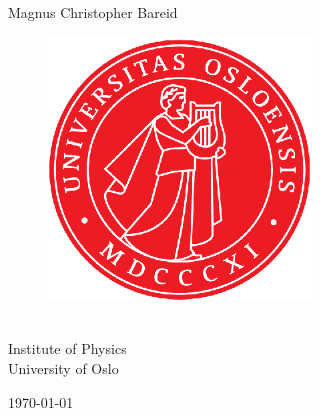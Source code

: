 \begin{titlepage}
    \begin{center}
    
    \bfseries
    \huge%
    \mintittel
    
    \vspace{2cm}
    \LARGE
    Magnus Christopher Bareid
    
    
    \vspace{1cm}
    \begin{figure}[h]
    \centering
    \includegraphics[width=7cm]{gen_figs/uiologo.eps}
    \centering
    \end{figure}
    \vspace{2cm}
    \Large
    \mintittel\\
    
    \vspace{0.8cm}
    \large
    Institute of Physics\\
    University of Oslo
    
    \vspace{0.8cm}
    \today
    
    \end{center}
    \normalfont
    
\end{titlepage}


    
    

